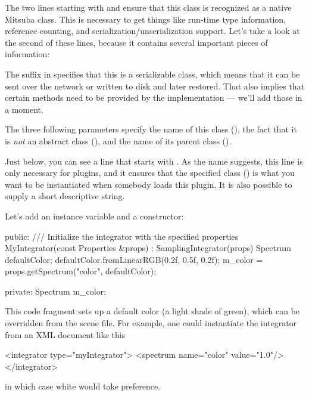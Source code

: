 The two lines starting with  and 
ensure that this class is recognized as a native Mitsuba class.
This is necessary to get things like run-time type information, reference counting,
and serialization/unserialization support. Let's take a look at the second of these
lines, because it contains several important pieces of information:

The suffix  in  specifies that this is
a serializable class, which means that it can be sent over the network or
written to disk and later restored. That also implies that certain methods
need to be provided by the implementation --- we'll add those in a moment.

The three following parameters specify the name of this class (),
the fact that it is \emph{not} an abstract class (), and the name of its
parent class ().

Just below, you can see a line that starts with
. As the name suggests, this line is only necessary
for plugins, and it ensures that the specified class () is
what you want to be instantiated when somebody loads this plugin. It is also
possible to supply a short descriptive string.
\vspace{3mm}

Let's add an instance variable and a constructor:
\begin{cpp}
public:
    /// Initialize the integrator with the specified properties
    MyIntegrator(const Properties &props) : SamplingIntegrator(props) {
        Spectrum defaultColor;
        defaultColor.fromLinearRGB(0.2f, 0.5f, 0.2f);
        m_color = props.getSpectrum("color", defaultColor);
    }

private:
    Spectrum m_color;
\end{cpp}

This code fragment sets up a default color (a light shade of green), which
can be overridden from the scene file. For example, one could instantiate
the integrator from an XML document like this

\begin{xml}
<integrator type="myIntegrator">
    <spectrum name="color" value="1.0"/>
</integrator>
\end{xml}
in which case white would take preference.
\vspace{3mm}

